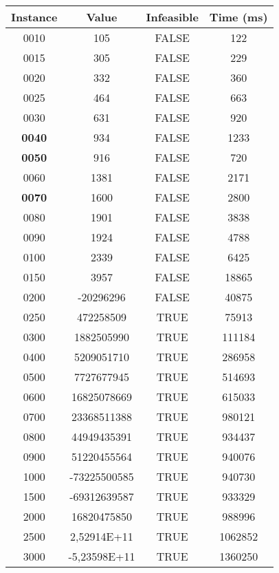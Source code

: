 \begin{center}
	\begin{tabular}{||c | c | c | c||} 
		\hline
		Instance  & Value & Infeasible & Time (ms) \\
		\hline\hline
		0010	& 	105	& 	FALSE	& 	122	\\
		0015	& 	305	& 	FALSE	& 	229	\\
		0020	& 	332	& 	FALSE	& 	360	\\
		0025	& 	464	& 	FALSE	& 	663	\\
		0030	& 	631	& 	FALSE	& 	920	\\
		\textbf{0040}	& 	934	& 	FALSE	& 	1233	\\
		\textbf{0050}	& 	916	& 	FALSE	& 	720	\\
		0060	& 	1381	& 	FALSE	& 	2171	\\
	\textbf{	0070}	& 	1600	& 	FALSE	& 	2800	\\
		0080	& 	1901	& 	FALSE	& 	3838	\\
		0090	& 	1924	& 	FALSE	& 	4788	\\
		0100	& 	2339	& 	FALSE	& 	6425	\\
		0150	& 	3957	& 	FALSE	& 	18865	\\
		0200	& 	-20296296	& 	FALSE	& 	40875	\\
		0250	& 	472258509	& 	TRUE	& 	75913	\\
		0300	& 	1882505990	& 	TRUE	& 	111184	\\
		0400	& 	5209051710	& 	TRUE	& 	286958	\\
		0500	& 	7727677945	& 	TRUE	& 	514693	\\
		0600	& 	16825078669	& 	TRUE	& 	615033	\\
		0700	& 	23368511388	& 	TRUE	& 	980121	\\
		0800	& 	44949435391	& 	TRUE	& 	934437	\\
		0900	& 	51220455564	& 	TRUE	& 	940076	\\
		1000	& 	-73225500585	& 	TRUE	& 	940730	\\
		1500	& 	-69312639587	& 	TRUE	& 	933329	\\
		2000	& 	16820475850	& 	TRUE	& 	988996	\\
		2500	& 	2,52914E+11	& 	TRUE	& 	1062852	\\
		3000	& 	-5,23598E+11	& 	TRUE	& 	1360250	\\
	
		\hline
	\end{tabular}
\end{center}
